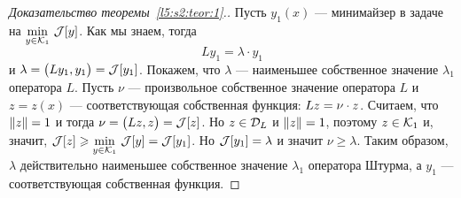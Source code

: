 \begin{proof}[Доказательство теоремы~\ref{l5:s2:teor:1}.]
	
	Пусть $y_1(x)$ --- минимайзер в задаче на $\min\limits_{y\in\mathcal{K}_1}\,\mathcal{J}[y]$. Как мы знаем, тогда 
	\begin{equation*}
		 Ly_1=\lambda\cdot y_1
	\end{equation*} 
	и $\lambda=\big(Ly_1,y_1\big)=\mathcal{J}[y_1]$. Покажем, что $\lambda$ --- наименьшее собственное значение $\lambda_1$ оператора $L$. Пусть $\nu$ --- произвольное собственное значение оператора $L$ и $z=z(x)$ --- соответствующая собственная функция: $Lz\?=\nu\cdot z$. Считаем, что $\left\|z\right\|=1$ и тогда $\nu=\big(Lz,z\big)=\mathcal{J}[z]$. Но $z\in\mathcal{D}_{L}$ и $\left\|z\right\|=1$, поэтому $z\in\mathcal{K}_1$ и{\mb,} значит{\mb,} $\mathcal{J}[z]\geqslant\min\limits_{y\in\mathcal{K}_1}\,\mathcal{J}[y]=\mathcal{J}[y_1]$. Но $\mathcal{J}[y_1]=\lambda$ и значит $\nu\geqslant\lambda$. Таким образом{\mb,} $\lambda$ действительно наименьшее собственное значение $\lambda_1$ оператора Штурма, а $y_1$ --- соответствующая собственная функция.
\end{proof}

